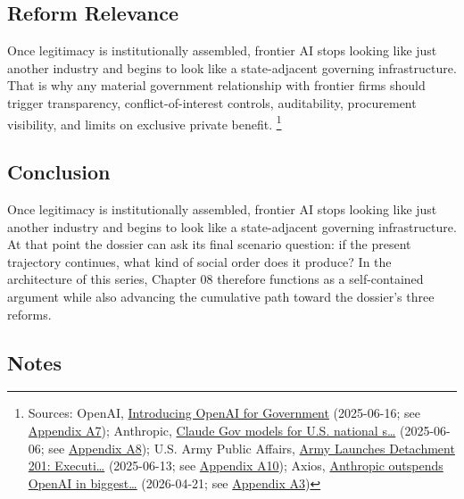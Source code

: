 \documentclass[
  american,
  11pt,
  letterpaper,
]{article}
\begin{document}
\subsection{Reform Relevance}\label{reform-relevance-8}

Once legitimacy is institutionally assembled, frontier AI stops looking
like just another industry and begins to look like a state-adjacent
governing infrastructure. That is why any material government
relationship with frontier firms should trigger transparency,
conflict-of-interest controls, auditability, procurement visibility, and
limits on exclusive private benefit. \footnote{Sources: OpenAI,
  \href{https://openai.com/global-affairs/introducing-openai-for-government/}{Introducing
  OpenAI for Government} (2025-06-16; see
  \hyperref[ch-08-appendix-a7-introducing-openai-for-government]{Appendix
  A7}); Anthropic,
  \href{https://www.anthropic.com/news/claude-gov-models-for-u-s-national-security-customers}{Claude
  Gov models for U.S. national s\ldots{}} (2025-06-06; see
  \hyperref[ch-08-appendix-a8-claude-gov-models-for-u-s-national-security-customers]{Appendix
  A8}); U.S. Army Public Affairs,
  \href{https://www.army.mil/article/286317/army_launches_detachment_201_executive_innovation_corps_to_drive_tech_transformation}{Army
  Launches Detachment 201: Executi\ldots{}} (2025-06-13; see
  \hyperref[ch-08-appendix-a10-army-launches-detachment-201-executive-innovation-corps-to-drive-tech-transformation]{Appendix
  A10}); Axios,
  \href{https://www.axios.com/2026/04/21/anthropic-outspends-openai-biggest-lobbying-quarter}{Anthropic
  outspends OpenAI in biggest\ldots{}} (2026-04-21; see
  \hyperref[ch-08-appendix-a3-anthropic-outspends-openai-in-biggest-ever-lobbying-quarter]{Appendix
  A3})}

\subsection{Conclusion}\label{conclusion-8}

Once legitimacy is institutionally assembled, frontier AI stops looking
like just another industry and begins to look like a state-adjacent
governing infrastructure. At that point the dossier can ask its final
scenario question: if the present trajectory continues, what kind of
social order does it produce? In the architecture of this series,
Chapter 08 therefore functions as a self-contained argument while also
advancing the cumulative path toward the dossier's three reforms.

\subsection{Notes}\label{notes-8}
\end{document}
